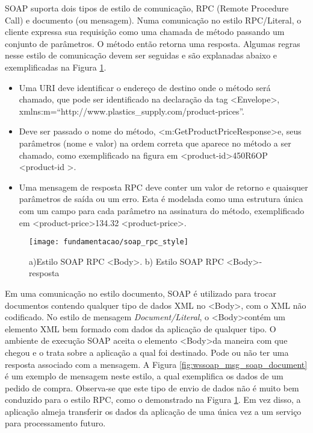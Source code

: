 SOAP suporta dois tipos de estilo de comunicação, RPC (Remote Procedure Call) e documento (ou mensagem). Numa comunicação no estilo RPC/Literal, o cliente expressa sua requisição como uma chamada de método passando um conjunto de parâmetros. O método então retorna uma resposta. Algumas regras nesse estilo de comunicação devem ser seguidas e são explanadas abaixo e exemplificadas na Figura \ref{fig:wssoap_msg_soap_rpc}.
\begin{itemize}
\item Uma URI deve identificar o endereço de destino onde o método será chamado, que pode ser identificado na declaração da tag \textless Envelope\textgreater, xmlns:m=``http://www.plastics_supply.com/product-prices''.
\item Deve ser passado o nome do método, \textless m:GetProductPriceResponse\textgreater e, seus parâmetros (nome e valor) na ordem correta que aparece no método a ser chamado, como exemplificado na figura em \textless product-id\textgreater 450R6OP \textless product-id \textgreater.
\item Uma mensagem de resposta RPC deve conter um valor de retorno e quaisquer parâmetros de saída ou um erro. Esta é modelada como uma estrutura única com um campo para cada parâmetro na assinatura do método, exemplificado em \textless product-price\textgreater 134.32 \textless product-price\textgreater.
\end{itemize}

\begin{figure}[!htb] \centering
  \centering
  \texttt{[image: fundamentacao/soap\_rpc\_style]} 
  \caption{a)Estilo SOAP RPC \textless Body\textgreater. b) Estilo SOAP RPC \textless Body\textgreater - resposta\cite{Papazoglou:2008}} 
  \label{fig:wssoap_msg_soap_rpc}
\end{figure}

Em uma comunicação no estilo documento, SOAP é utilizado para trocar documentos contendo qualquer tipo de dados XML no \textless Body\textgreater, com o XML não codificado. No estilo de mensagem \textit{Document/Literal}, o \textless Body\textgreater contém um elemento XML bem formado com dados da aplicação de qualquer tipo. O ambiente de execução SOAP aceita o elemento \textless Body\textgreater da maneira com que chegou e o trata sobre a aplicação a qual foi destinado. Pode ou não ter uma resposta associado com a mensagem. A Figura \ref{fig:wssoap_msg_soap_document} é um exemplo de mensagem neste estilo, a qual exemplifica os dados de um pedido de compra. Observa-se que este tipo de envio de dados não é muito bem conduzido para o estilo RPC, como o demonstrado na Figura \ref{fig:wssoap_msg_soap_rpc}. Em vez disso, a aplicação almeja transferir os dados da aplicação de uma única vez a um serviço para processamento futuro.\cite{Papazoglou:2008}

